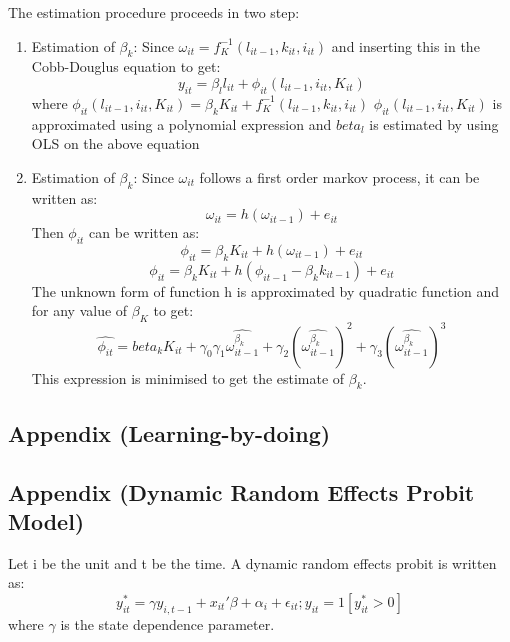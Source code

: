 \documentclass[11pt]{article}
\begin{document}
The estimation procedure proceeds in two step:
\begin{enumerate}
\item Estimation of $\beta_{k}$:
Since $\omega_{it}=f_{K}^{-1}(l_{it-1},k_{it},i_{it})$ and inserting
this in the Cobb-Douglus equation to get: 
$$ y_{it} = \beta_{l}l_{it} + \phi_{it}(l_{it-1},i_{it},K_{it})$$
where $\phi_{it}(l_{it-1},i_{it},K_{it}) =  \beta_{k}K_{it}+ f_{K}^{-1}(l_{it-1},k_{it},i_{it})$
$\phi_{it}(l_{it-1},i_{it},K_{it})$ is approximated using a polynomial
expression and $beta_{l}$ is estimated by using OLS on the above
equation
\item Estimation of $\beta_{k}$:
Since $\omega_{it}$ follows a first order markov process, it can be
written as: 
$$ \omega_{it} = h(\omega_{it-1}) + e_{it}$$
Then $\phi_{it}$ can be written as: 
$$ \phi_{it} = \beta_{k}K_{it} + h(\omega_{it-1}) + e_{it}$$
$$ \phi_{it} = \beta_{k}K_{it} + h(\phi_{it-1}- \beta_{k}k_{it-1}) + e_{it}$$
The unknown form of function h is approximated by quadratic function
and for any value of $\beta_K$ to get:
$$ \hat{\phi_{it}} = beta_{k}K_{it} +\gamma_{0}
\gamma_{1}\hat{\omega_{it-1}^{\beta_{k}}}+
\gamma_{2}(\hat{\omega_{it-1}^{\beta_{k}}})^{2}
+ \gamma_{3}(\hat{\omega_{it-1}^{\beta_{k}}})^{3} $$
 This expression is minimised to get the estimate of $\beta_{k}$. 
\end{enumerate}

\subsection{Appendix (Learning-by-doing)}
 


 


\subsection{Appendix (Dynamic Random Effects Probit  Model)}
Let i be the unit and t be the time. A dynamic random effects probit
is written as: 
$$ y_{it}^{*} = \gamma y_{i,t-1} + x_{it}'\beta + \alpha_{i} +
\epsilon_{it}; y_{it}=1[y_{it}^{*} > 0]$$
where $\gamma$ is the state dependence parameter.
\end{document}

